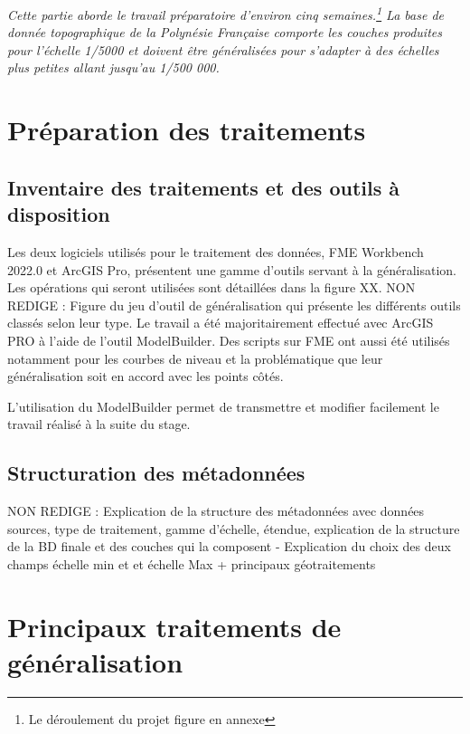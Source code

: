 
\textit{Cette partie aborde le travail préparatoire d'environ cinq semaines.\footnote{Le déroulement du projet figure en annexe} La base de donnée topographique de la Polynésie Française comporte les couches produites pour l'échelle 1/5000 et doivent être généralisées pour s'adapter à des échelles plus petites allant jusqu'au 1/500 000.}




\section{Préparation des traitements}
\subsection{Inventaire des traitements et des outils à disposition}

Les deux logiciels utilisés pour le traitement des données, FME Workbench 2022.0 et ArcGIS Pro, présentent une gamme d'outils servant à la généralisation. Les opérations qui seront utilisées sont détaillées dans la figure XX. 
{\color{magenta} NON REDIGE : Figure du jeu d'outil de généralisation qui présente les différents outils classés selon leur type.}
Le travail a été majoritairement effectué avec ArcGIS PRO à l'aide de l'outil ModelBuilder. Des scripts sur FME ont aussi été utilisés notamment pour les courbes de niveau et la problématique que leur généralisation soit en accord avec les points côtés. %

L’utilisation du ModelBuilder permet de transmettre et modifier facilement le travail réalisé à la suite du stage. 

\subsection{Structuration des métadonnées}

{\color{magenta} NON REDIGE : Explication de la structure des métadonnées avec données sources, type de traitement, gamme d'échelle, étendue, explication de la structure de la BD finale et des couches qui la composent - Explication du choix des deux champs échelle min et et échelle Max + principaux géotraitements}


\section{Principaux traitements de généralisation}

